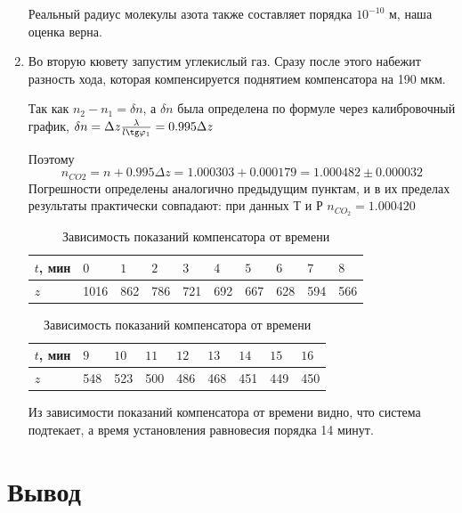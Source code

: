 \documentclass[a4paper,12pt]{article}
\theoremstyle{definition}
\begin{document}
\begin{enumerate}
Реальный радиус молекулы азота также составляет порядка $10^{-10}$ м, наша оценка верна.

\item Во вторую кювету запустим углекислый газ. Сразу после этого набежит разность хода, которая компенсируется поднятием компенсатора на 190 мкм.

Так как $n_2 - n_1 = \delta n$, а $\delta n$ была определена по формуле через калибровочный график, $\delta n = \Delta z \frac{\lambda}{l \tg \varphi_1} = 0.995 \Delta z$

Поэтому 
\begin{equation}
    n_{CO2} = n + 0.995\Delta z = 1.000303 + 0.000179 = 1.000482 \pm 0.000032
\end{equation} 
Погрешности определены аналогично предыдущим пунктам, и в их пределах результаты практически совпадают: при данных Т и Р $n_{CO_{2}} = 1.000420$

\begin{table}[h]
    \centering
    \caption{Зависимость показаний компенсатора от времени}
    \begin{tabular}{|*{10}{l|}} \hline
        $t$, мин & $0$ & $1$ & $2$ & $3$ & $4$ & $5$ & $6$ & $7$ & $8$\\ \hline
        $z$ & 1016 & 862 & 786 & 721 & 692 & 667 & 628 & 594 & 566 \\ \hline   
    \end{tabular}
    \begin{tabular}{|*{9}{l|}} \hline
        $t$, мин  & $9$ & $10$ & $11$ & $12$ & $13$ & $14$ & $15$ & $16$ \\ \hline
        $z$ & 548 & 523 & 500 & 486 & 468 & 451 & 449 & 450 \\ \hline   
    \end{tabular}
\end{table}

Из зависимости показаний компенсатора от времени видно, что система подтекает, а время установления равновесия порядка 14 минут.
\end{enumerate}

\section{Вывод}
\end{document}
